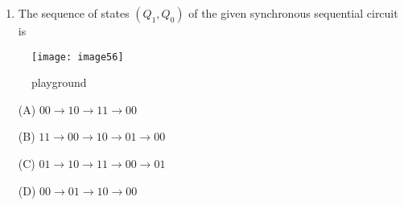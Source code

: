 \documentclass{article}
\begin{document}
\begin{enumerate}
    \item The sequence of states $(Q_1, Q_0)$ of the given synchronous sequential circuit is \underline{\hspace{2cm}}
\end{enumerate}

\begin{figure}[!ht]
	\centering
	\texttt{[image: image56]}
	\caption{playground}
	\label{fig:enter-label}
\end{figure}

\begin{enumerate}
    \item[(A)] $00 \rightarrow 10 \rightarrow 11 \rightarrow 00$
    \item[(B)] $11 \rightarrow 00 \rightarrow 10 \rightarrow 01 \rightarrow 00$
    \item[(C)] $01 \rightarrow 10 \rightarrow 11 \rightarrow 00 \rightarrow 01$
    \item[(D)] $00 \rightarrow 01 \rightarrow 10 \rightarrow 00$
\end{enumerate}
\end{document}
